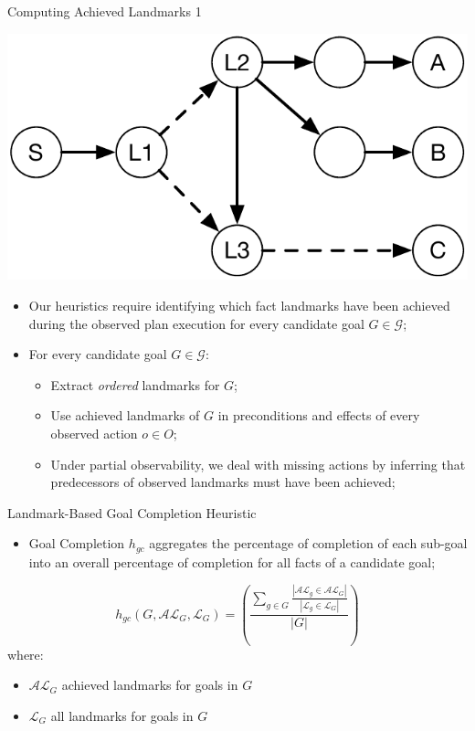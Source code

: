\documentclass{beamer}
\newcommand{\todo}[1]{ {\color{red} #1} }
\def\masterclass{1}
\begin{document}
    \begin{frame}{Computing Achieved Landmarks}
		\if\masterclass1
		\fi
		\begin{center}
		    \includegraphics[width=.4\textwidth]{example.pdf} 
		\end{center}
		
       	\begin{itemize}
       		\item Our heuristics require identifying which fact landmarks have been achieved during the observed plan execution for every candidate goal $G \in \mathcal{G}$;
            \item For every candidate goal $G \in \mathcal{G}$:
            	\begin{itemize}
                	\item Extract \emph{ordered} landmarks for $G$;
                    \item Use achieved landmarks of $G$ in preconditions and effects of every observed action $o \in O$;
                   \item Under partial observability, we deal with missing actions by inferring that predecessors of observed landmarks must have been achieved;
                \end{itemize}
		\end{itemize}
    \end{frame}
	

    \begin{frame}{Landmark-Based Goal Completion Heuristic}
       	\begin{itemize}
       		\item Goal Completion $h_{gc}$ aggregates the percentage of completion of each sub-goal into an overall percentage of completion for all facts of a candidate goal;
		\end{itemize}
		
		\begin{equation}
			h_{gc}(G, \mathcal{AL}_{G}, \mathcal{L}_{G}) = \left(\frac{\sum_{g \in G} \frac{|\mathcal{AL}_{g} \in \mathcal{AL}_{G} |}{|\mathcal{L}_{g} \in \mathcal{L}_{G}|}}{ |G| }\right)
		\end{equation}
		where:
		\begin{itemize}
			\item $\mathcal{AL}_{G}$ achieved landmarks for goals in $G$
			\item $\mathcal{L}_{G}$ all landmarks for goals in $G$
		\end{itemize}
    \end{frame}
	
\end{document}
